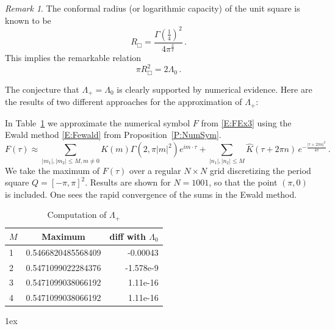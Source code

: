 \documentclass[12pt]{amsart}
\theoremstyle{definition}
\theoremstyle{remark}
\newtheorem{remark}[theorem]{Remark}
\numberwithin{equation}{section}
\let\hat=\widehat
\begin{document}
\begin{remark}
 \label{R:confrad}
 The conformal radius (or logarithmic capacity) of the unit square is known to be \cite[Tables]{PolyaSzego1951}
 $$
   R_{\Box}= \frac{\Gamma(\frac14)^{2}}{4\pi^{\frac32}}\,.
 $$
 This implies the remarkable relation
 \begin{equation}
\label{E:ConfArea}
  \pi R_{\Box}^{2}= 2 \Lambda_{0} \,.
\end{equation}
\end{remark}
The conjecture that $\Lambda_{+}=\Lambda_{0}$ is clearly supported by numerical evidence. Here are the results of two different approaches for the approximation of $\Lambda_{+}$: 

In Table~\ref{T:supF} we approximate the numerical symbol $F$ from \eqref{E:FEx3} using the Ewald method \eqref{E:Fewald} from Proposition~\ref{P:NumSym}.
\begin{equation}
\label{E:FewaldEx3}
 F(\tau) \approx 
 \sum_{|m_{1}|,|m_{2}|\le M,m\ne0}K(m)\Gamma(2,\pi|m|^{2})e^{im\cdot \tau} +
 \sum_{|n_{1}|,|n_{2}|\le M}\hat K(\tau+2\pi n)\,e^{-\frac{|\tau+2\pi n|^{2}}{4\pi}}\,.
\end{equation}
We take the maximum of $F(\tau)$ over a regular $N\times N$ grid discretizing the period square $Q=[-\pi,\pi]^{2}$. Results are shown for $N=1001$, so that the point $(\pi,0)$ is included. One sees the rapid convergence of the sums in the Ewald method. 
\begin{table}[htbp]
   \centering
    \begin{tabular}{@{} lcr @{}} 
      \toprule
      $M$    & Maximum & diff with $\Lambda_{0}$\\
      \midrule
1 & 0.5466820485568409 & -0.00043 \\
2 & 0.5471099022284376 & -1.578e-9\\
3 & 0.5471099038066192 & 1.11e-16\\
4 & 0.5471099038066192 & 1.11e-16\\
      \bottomrule
   \end{tabular}\vglue1ex
   \caption{Computation of $\Lambda_{+}$}
   \label{T:supF}
\end{table}
\end{document}
